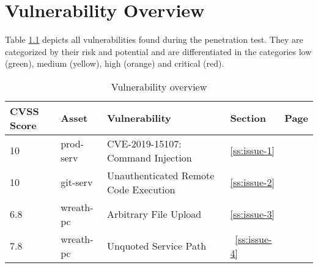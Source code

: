 \chapter{Vulnerability Overview}
Table \ref{tbl:vuln overview} depicts all vulnerabilities found during the penetration test. They are categorized by their risk and potential and are differentiated in the categories low (green), medium (yellow), high (orange) and critical (red).

\begin{table}[h]
	\begin{tabular}{| l | l | p{7cm} | l | l |}
		\hline
		CVSS Score & Asset & Vulnerability & Section & Page\\
		\hline
		\cellcolor{red}10 & prod-serv & CVE-2019-15107: Command Injection &  \ref{ss:issue-1} & \pageref{ss:issue-1} \\
		\hline
		\cellcolor{red}10 & git-serv & Unauthenticated Remote Code Execution & \ref{ss:issue-2} & \pageref{ss:issue-2} \\
		\hline
		\cellcolor{yellow}6.8 & wreath-pc & Arbitrary File Upload & \ref{ss:issue-3} & \pageref{ss:issue-3} \\
		\hline
		\cellcolor{orange}7.8 & wreath-pc & Unquoted Service Path & ~\ref{ss:issue-4} & ~\pageref{ss:issue-4} \\
		\hline
	\end{tabular}
	\caption{Vulnerability overview}
	\label{tbl:vuln overview}
\end{table}
